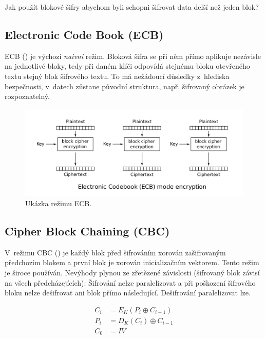 Jak použít blokové šifry abychom byli schopni šifrovat data delší než jeden blok?

\subsection{Electronic Code Book (ECB)}

ECB () je výchozí \textit{naivní} režim. Bloková šifra se při něm přímo aplikuje nezávisle na jednotlivé bloky, tedy při daném klíči odpovídá stejnému bloku otevřeného textu stejný blok šifrového textu. To má nežádoucí důsledky z~hlediska bezpečnosti, v~datech zůstane původní struktura, např. šifrovaný obrázek je rozpoznatelný.

\begin{figure}[H]
    \centering
    \includegraphics[width=1\linewidth]{rezim_ecb.png}
    \caption{Ukázka režimu ECB.}
\end{figure}

\subsection{Cipher Block Chaining (CBC)}

V~režimu CBC () je každý blok před šifrováním xorován zašifrovaným předchozím blokem a první blok je xorován inicializačním vektorem. Tento režim je široce používán. Nevýhody plynou ze zřetězené závislosti (šifrovaný blok závisí na všech předcházejících): Šifrování nelze paralelizovat a při poškození šifrového bloku nelze dešifrovat ani blok přímo následující. Dešifrování paralelizovat lze.

\begin{equation}
\begin{aligned}
C_i &= E_K (P_i \oplus C_{i-1}) \\
P_i &= D_K(C_i) \oplus C_{i-1} \\
C_0 &= IV
\end{aligned}
\end{equation}

